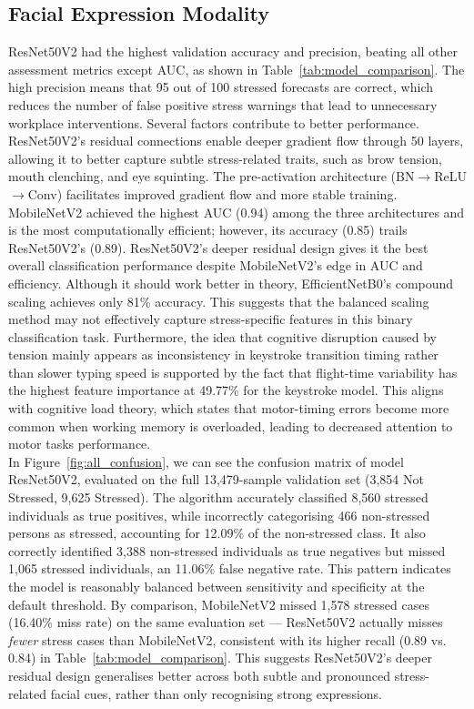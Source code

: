 \documentclass[fleqn,10pt]{wlscirep}
\begin{document}
\subsection*{Facial Expression Modality}
ResNet50V2 had the highest validation accuracy and precision, beating all other assessment metrics except AUC, as shown in Table~\ref{tab:model_comparison}. The high precision means that 95 out of 100 stressed forecasts are correct, which reduces the number of false positive stress warnings that lead to unnecessary workplace interventions. Several factors contribute to better performance. ResNet50V2's residual connections enable deeper gradient flow through 50 layers, allowing it to better capture subtle stress-related traits, such as brow tension, mouth clenching, and eye squinting. The pre-activation architecture (BN$\rightarrow$ReLU$\rightarrow$Conv) facilitates improved gradient flow and more stable training. MobileNetV2 achieved the highest AUC (0.94) among the three architectures and is the most computationally efficient; however, its accuracy (0.85) trails ResNet50V2's (0.89). ResNet50V2's deeper residual design gives it the best overall classification performance despite MobileNetV2's edge in AUC and efficiency. Although it should work better in theory, EfficientNetB0's compound scaling achieves only 81\% accuracy. This suggests that the balanced scaling method may not effectively capture stress-specific features in this binary classification task.
Furthermore, the idea that cognitive disruption caused by tension mainly appears as inconsistency in keystroke transition timing rather than slower typing speed is supported by the fact that flight-time variability has the highest feature importance at 49.77\% for the keystroke model. This aligns with cognitive load theory, which states that motor-timing errors become more common when working memory is overloaded, leading to decreased attention to motor tasks performance.\\
In Figure~\ref{fig:all_confusion}, we can see the confusion matrix of model ResNet50V2, evaluated on the full 13,479-sample validation set (3,854 Not Stressed, 9,625 Stressed). The algorithm accurately classified 8,560 stressed individuals as true positives, while incorrectly categorising 466 non-stressed persons as stressed, accounting for 12.09\% of the non-stressed class. It also correctly identified 3,388 non-stressed individuals as true negatives but missed 1,065 stressed individuals, an 11.06\% false negative rate. This pattern indicates the model is reasonably balanced between sensitivity and specificity at the default threshold. By comparison, MobileNetV2 missed 1,578 stressed cases (16.40\% miss rate) on the same evaluation set --- ResNet50V2 actually misses \textit{fewer} stress cases than MobileNetV2, consistent with its higher recall (0.89 vs. 0.84) in Table~\ref{tab:model_comparison}. This suggests ResNet50V2's deeper residual design generalises better across both subtle and pronounced stress-related facial cues, rather than only recognising strong expressions.
\end{document}
